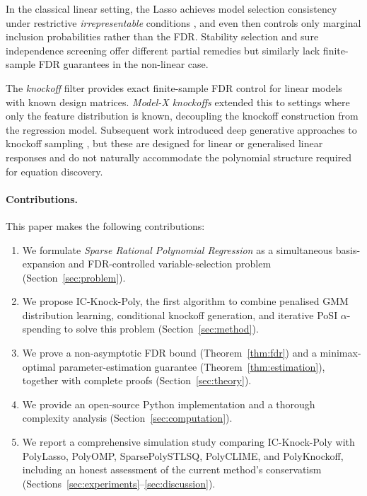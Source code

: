 \documentclass[11pt, a4paper]{article}
\begin{document}
In the classical linear setting, the Lasso \cite{tibshirani1996regression}
achieves model selection consistency under restrictive \emph{irrepresentable}
conditions \cite{zhao2006model}, and even then controls only marginal
inclusion probabilities rather than the FDR.  Stability selection
\cite{meinshausen2010stability} and sure independence screening
\cite{fan2008sure} offer different partial remedies but similarly lack
finite-sample FDR guarantees in the non-linear case.

The \emph{knockoff} filter \cite{barber2015controlling} provides exact
finite-sample FDR control for linear models with known design matrices.
\emph{Model-X knockoffs} \cite{candes2018panning} extended this to settings
where only the feature distribution is known, decoupling the knockoff
construction from the regression model.  Subsequent work introduced deep
generative approaches to knockoff sampling \cite{romano2020deep,liu2018auto},
but these are designed for linear or generalised linear responses and do not
naturally accommodate the polynomial structure required for equation
discovery.

\paragraph{Contributions.}
This paper makes the following contributions:
\begin{enumerate}
  \item We formulate \emph{Sparse Rational Polynomial Regression} as a
    simultaneous basis-expansion and FDR-controlled variable-selection problem
    (Section~\ref{sec:problem}).
  \item We propose IC-Knock-Poly, the first algorithm to combine penalised
    GMM distribution learning, conditional knockoff generation, and iterative
    PoSI $\alpha$-spending to solve this problem
    (Section~\ref{sec:method}).
  \item We prove a non-asymptotic FDR bound (Theorem~\ref{thm:fdr}) and a
    minimax-optimal parameter-estimation guarantee
    (Theorem~\ref{thm:estimation}), together with complete proofs
    (Section~\ref{sec:theory}).
  \item We provide an open-source Python implementation and a thorough
    complexity analysis (Section~\ref{sec:computation}).
  \item We report a comprehensive simulation study comparing IC-Knock-Poly
    with PolyLasso, PolyOMP, SparsePolySTLSQ, PolyCLIME, and PolyKnockoff,
    including an honest assessment of the current method's conservatism
    (Sections~\ref{sec:experiments}--\ref{sec:discussion}).
\end{enumerate}
\end{document}
